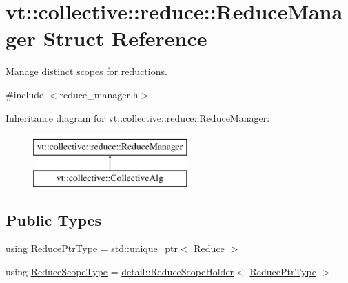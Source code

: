 \hypertarget{structvt_1_1collective_1_1reduce_1_1_reduce_manager}{}\section{vt\+:\+:collective\+:\+:reduce\+:\+:Reduce\+Manager Struct Reference}
\label{structvt_1_1collective_1_1reduce_1_1_reduce_manager}


Manage distinct scopes for reductions.  




{\ttfamily \#include $<$reduce\+\_\+manager.\+h$>$}

Inheritance diagram for vt\+:\+:collective\+:\+:reduce\+:\+:Reduce\+Manager\+:\begin{figure}[H]
\begin{center}
\leavevmode
\includegraphics[height=2.000000cm]{structvt_1_1collective_1_1reduce_1_1_reduce_manager}
\end{center}
\end{figure}
\subsection*{Public Types}
\begin{DoxyCompactItemize}
\item 
using \hyperlink{structvt_1_1collective_1_1reduce_1_1_reduce_manager_ae6d6635476f9d9f601d131a334ca3817}{Reduce\+Ptr\+Type} = std\+::unique\+\_\+ptr$<$ \hyperlink{structvt_1_1collective_1_1reduce_1_1_reduce}{Reduce} $>$
\item 
using \hyperlink{structvt_1_1collective_1_1reduce_1_1_reduce_manager_a2c340e5d3b12e4f2df64b9c1502445cf}{Reduce\+Scope\+Type} = \hyperlink{structvt_1_1collective_1_1reduce_1_1detail_1_1_reduce_scope_holder}{detail\+::\+Reduce\+Scope\+Holder}$<$ \hyperlink{structvt_1_1collective_1_1reduce_1_1_reduce_manager_ae6d6635476f9d9f601d131a334ca3817}{Reduce\+Ptr\+Type} $>$
\end{DoxyCompactItemize}
